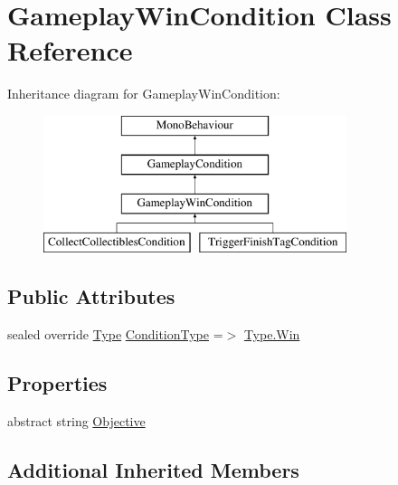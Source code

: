 \hypertarget{class_gameplay_win_condition}{}\section{Gameplay\+Win\+Condition Class Reference}
\label{class_gameplay_win_condition}
Inheritance diagram for Gameplay\+Win\+Condition\+:\begin{figure}[H]
\begin{center}
\leavevmode
\includegraphics[height=4.000000cm]{class_gameplay_win_condition}
\end{center}
\end{figure}
\subsection*{Public Attributes}
\begin{DoxyCompactItemize}
\item 
sealed override \mbox{\hyperlink{class_gameplay_condition_af7549fe9ce5328062dab831d05ca9702}{Type}} \mbox{\hyperlink{class_gameplay_win_condition_a388f170d486b12e620424f790e897804}{Condition\+Type}} =$>$ \mbox{\hyperlink{class_gameplay_condition_af7549fe9ce5328062dab831d05ca9702a119eac47719cc9be7b99124712e229da}{Type.\+Win}}
\end{DoxyCompactItemize}
\subsection*{Properties}
\begin{DoxyCompactItemize}
\item 
abstract string \mbox{\hyperlink{class_gameplay_win_condition_a2dc8db4dc7f3307032166895be15fed3}{Objective}}
\end{DoxyCompactItemize}
\subsection*{Additional Inherited Members}


